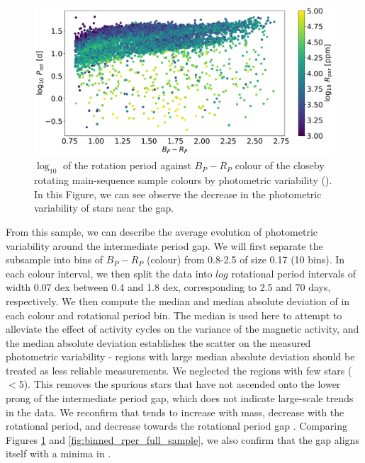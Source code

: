 \begin{figure}
\centering
  \includegraphics[width=\textwidth]{Figures/rot_gap_figures/rotational_dist.png}
  \caption{
  $\log_{10}$ of the rotation period against \gaia $B_P-R_P$ colour of the closeby rotating main-sequence sample colours by photometric variability (\rper{}). 
In this Figure, we can see observe the decrease in the photometric variability of stars near the gap.}
  \label{fig:prawn}
\end{figure}

From this sample, we can describe the average evolution of photometric variability around the intermediate period gap.
We will first separate the subsample into bins of $B_P - R_P$ (colour) from 0.8-2.5 of size 0.17 (10 bins).
In each colour interval, we then split the data into $log$ rotational period intervals of width 0.07 dex between 0.4 and 1.8 dex, corresponding to 2.5 and 70 days, respectively.
We then compute the median and median absolute deviation of \rper{} in each colour and rotational period bin.
The median is used here to attempt to alleviate the effect of activity cycles on the variance of the magnetic activity, and the median absolute deviation establishes the scatter on the measured photometric variability - regions with large median absolute deviation should be treated as less reliable measurements.
We neglected the regions with few stars ($<$5).
This removes the spurious stars that have not ascended onto the lower prong of the intermediate period gap, which does not indicate large-scale trends in the data.
We reconfirm that \rper{} tends to increase with mass, decrease with the rotational period, and decrease towards the rotational period gap \citep{reinhold_stellar_2020, basri_double_2018 , santos_surface_2021}.
Comparing Figures \ref{fig:prawn} and \ref{fig:binned_rper_full_sample}, we also confirm that the gap aligns itself with a minima in \rper{}.

